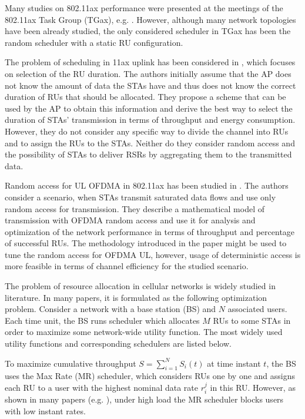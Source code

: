 Many studies on 802.11ax performance were presented at the meetings of the 802.11ax Task Group (TGax), e.g. \cite{ofdma-par1, ofdma-par2}.
However, although many network topologies have been already studied, the only considered scheduler in TGax has been the random scheduler with a static RU configuration.

The problem of scheduling in 11ax uplink has been considered in \cite{karaca2016resource}, which focuses on selection of the RU duration.
The authors initially assume that the AP does not know the amount of data the STAs have and thus does not know the correct duration of RUs that should be allocated.
They propose a scheme that can be used by the AP to obtain this information and derive the best way to select the duration of STAs' transmission in terms of throughput and energy consumption.
However, they do not consider any specific way to divide the channel into RUs and to assign the RUs to the STAs.
Neither do they consider random access and the possibility of STAs to deliver RSRs by aggregating them to the transmitted data.


Random access for UL OFDMA in 802.11ax has been studied in \cite{lanante2017performance}.
The authors consider a scenario, when STAs transmit saturated data flows and use only random access for transmission.
They describe a mathematical model of transmission with OFDMA random access and use it for analysis and optimization of the network performance in terms of throughput and percentage of successful RUs.
The methodology introduced in the paper might be used to tune the random access for OFDMA UL, however, usage of deterministic access is more feasible in terms of channel efficiency for the studied scenario.

The problem of resource allocation in cellular networks is widely studied in literature.
In many papers, it is formulated as the following optimization problem.
Consider a network with a base station (BS) and $N$ associated users.
Each time unit, the BS runs scheduler which allocates $M$ RUs to some STAs in order to maximize some network-wide utility function.
The most widely used utility functions and corresponding schedulers are listed below. 

To maximize cumulative throughput $S = \sum\limits_{i=1}^N S_i(t)$ at time instant $t$, the BS uses the Max Rate (MR) scheduler, which considers RUs one by one and assigns each RU to a user with the highest nominal data rate $r_{i}^{j}$ in this RU.
However, as shown in many papers (e.g. \cite{capozzi2013downlink}), under high load the MR scheduler blocks users with low instant rates.

